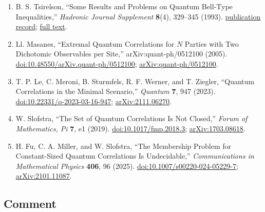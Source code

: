 \begin{enumerate}[label={},leftmargin=4.8em,labelsep=0.5em]
  \footnotesize
  \item[\textup{[Tsi93]}]\label{ref:p31-tsirelson}
  B. S. Tsirelson, ``Some Results and Problems on Quantum Bell-Type
  Inequalities,'' \emph{Hadronic Journal Supplement} \textbf{8}(4), 329--345
  (1993).
  \href{https://cris.tau.ac.il/en/publications/some-results-and-problems-on-quantum-bell-type-inequalities/}{publication record};
  \href{https://ma.huji.ac.il/~ohadfeld/Tsirelson/download/hadron.html}{full text}.

  \item[\textup{[Mas05]}]\label{ref:p31-masanes}
  Ll. Masanes, ``Extremal Quantum Correlations for $N$ Parties with Two
  Dichotomic Observables per Site,'' arXiv:quant-ph/0512100 (2005).
  \href{https://doi.org/10.48550/arXiv.quant-ph/0512100}{doi:10.48550/arXiv.quant-ph/0512100};
  \href{https://arxiv.org/abs/quant-ph/0512100}{arXiv:quant-ph/0512100}.

  \item[\textup{[LMSWZ23]}]\label{ref:p31-le}
  T. P. Le, C. Meroni, B. Sturmfels, R. F. Werner, and T. Ziegler, ``Quantum
  Correlations in the Minimal Scenario,'' \emph{Quantum} \textbf{7}, 947
  (2023). \href{https://doi.org/10.22331/q-2023-03-16-947}{doi:10.22331/q-2023-03-16-947};
  \href{https://arxiv.org/abs/2111.06270}{arXiv:2111.06270}.

  \item[\textup{[Slo19]}]\label{ref:p31-slofstra}
  W. Slofstra, ``The Set of Quantum Correlations Is Not Closed,''
  \emph{Forum of Mathematics, Pi} \textbf{7}, e1 (2019).
  \href{https://doi.org/10.1017/fmp.2018.3}{doi:10.1017/fmp.2018.3};
  \href{https://arxiv.org/abs/1703.08618}{arXiv:1703.08618}.

  \item[\textup{[FMS25]}]\label{ref:p31-fu}
  H. Fu, C. A. Miller, and W. Slofstra, ``The Membership Problem for
  Constant-Sized Quantum Correlations Is Undecidable,'' \emph{Communications
  in Mathematical Physics} \textbf{406}, 96 (2025).
  \href{https://doi.org/10.1007/s00220-024-05229-7}{doi:10.1007/s00220-024-05229-7};
  \href{https://arxiv.org/abs/2101.11087}{arXiv:2101.11087}.
\end{enumerate}

\subsection*{Comment}


